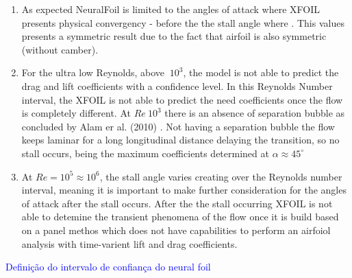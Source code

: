 \begin{enumerate}
    \item As expected NeuralFoil is limited to the angles of attack where XFOIL presents physical convergency - before the the stall angle where . This values presents a symmetric result due to the fact that airfoil is also symmetric (without camber).
    
    \item For the ultra low Reynolds, above $~ 10^3$, the model is not able to predict the drag and lift coefficients with a confidence level. In this Reynolds Number interval, the XFOIL is not able to predict the need coefficients once the flow is completely different. At $Re ~ 10^3$ there is an absence of separation bubble as  concluded by Alam er al. (2010) \cite{alam_ultra-low_2010}. Not having a separation bubble the flow keeps laminar for a long longitudinal distance delaying the transition, so no stall occurs, being the maximum coefficients determined at $\alpha \approx 45 ^{\circ}$
    
    \item At $Re = 10^5 \approx 10^6$, the stall angle varies creating over the Reynolds number interval, meaning it is important to make further consideration for the angles of attack after the stall occurs. After the the stall occurring XFOIL is not able to detemine the transient phenomena of the flow once it is build based on a panel methos which does not have capabilities to perform an airfoiol analysis with time-varient lift and drag coefficients.

\end{enumerate}

\textcolor{blue}{Definição do intervalo de confiança do neural foil}\\

